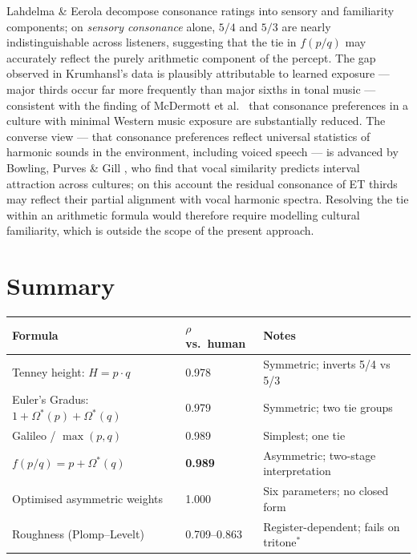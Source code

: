 \documentclass[11pt,a4paper]{article}
\newcommand{\Os}{\Omega^{*}}
\begin{document}
Lahdelma \& Eerola \cite{lahdelma2016} decompose consonance ratings into
sensory and familiarity components; on \emph{sensory consonance} alone,
$5/4$ and $5/3$ are nearly indistinguishable across listeners, suggesting
that the tie in $f(p/q)$ may accurately reflect the purely arithmetic
component of the percept. The gap observed in Krumhansl's data is plausibly
attributable to learned exposure --- major thirds occur far more frequently
than major sixths in tonal music --- consistent with the finding of McDermott et al.\ \cite{mcdermott2016} that
consonance preferences in a culture with minimal Western music exposure are
substantially reduced. The converse view --- that consonance preferences
reflect universal statistics of harmonic sounds in the environment, including
voiced speech --- is advanced by Bowling, Purves \& Gill \cite{bowling2018},
who find that vocal similarity predicts interval attraction across cultures;
on this account the residual consonance of ET thirds may reflect their
partial alignment with vocal harmonic spectra.
Resolving the tie within an arithmetic formula would therefore require
modelling cultural familiarity, which is outside the scope of the present
approach.


\section{Summary}

\medskip
\begin{tabular}{lll}
\toprule
Formula & $\rho$ vs.\ human & Notes \\
\midrule
Tenney height: $H = p \cdot q$          & 0.978 & Symmetric; inverts 5/4 vs 5/3 \\
Euler's Gradus: $1 + \Os(p) + \Os(q)$ & 0.979 & Symmetric; two tie groups \\
Galileo / $\max(p,q)$                  & 0.989 & Simplest; one tie \\
$f(p/q) = p + \Os(q)$                  & \textbf{0.989} & Asymmetric; two-stage interpretation \\
Optimised asymmetric weights            & 1.000 & Six parameters; no closed form \\
Roughness (Plomp--Levelt)              & 0.709--0.863 & Register-dependent; fails on tritone$^*$ \\
\bottomrule
\end{tabular}
\end{document}
